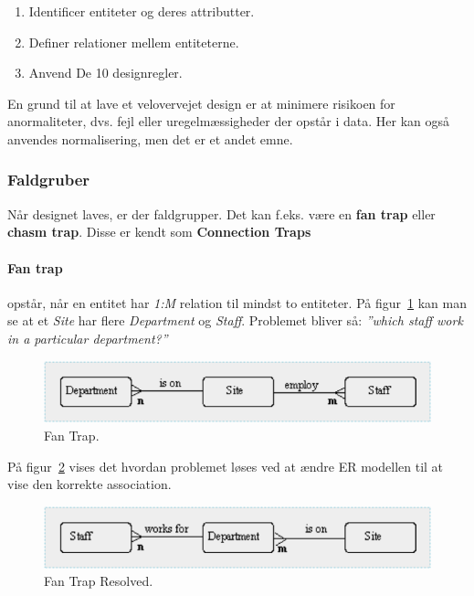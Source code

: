 \begin{enumerate}
	\item Identificer entiteter og deres attributter.
	\item Definer relationer mellem entiteterne.
	\item Anvend De 10 designregler.
\end{enumerate}

En grund til at lave et velovervejet design er at minimere risikoen for anormaliteter, dvs. fejl eller uregelmæssigheder der opstår i data. Her kan også anvendes normalisering, men det er et andet emne.

\subsubsection{Faldgruber}
Når designet laves, er der faldgrupper. Det kan f.eks. være en \textbf{fan trap} eller \textbf{chasm trap}. Disse er kendt som \textbf{Connection Traps} 

\paragraph{Fan trap} opstår, når en entitet har \textit{1:M} relation til mindst to entiteter. På figur~\ref{fig:fan} kan man se at et \textit{Site} har flere \textit{Department} og \textit{Staff}. Problemet bliver så: \textit{''which staff work in a particular department?''}

\begin{figure}[h]
\centering
\includegraphics[width=0.8\linewidth]{figs/spm2/fan}
\caption{Fan Trap.}
\label{fig:fan}
\end{figure}

På figur~\ref{fig:fan_solved} vises det hvordan problemet løses ved at ændre ER modellen til at vise den korrekte association.

\begin{figure}[h]
\centering
\includegraphics[width=0.8\linewidth]{figs/spm2/fan_solved}
\caption{Fan Trap Resolved.}
\label{fig:fan_solved}
\end{figure}

